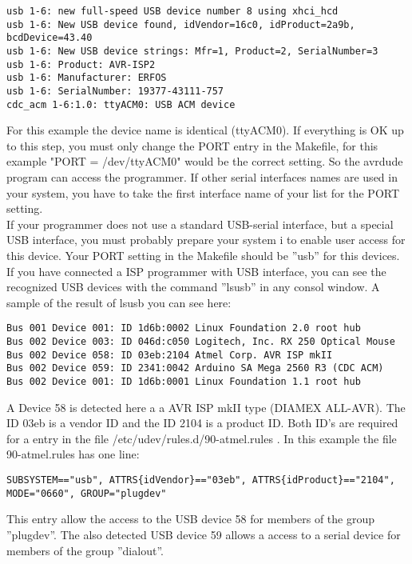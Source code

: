 \begin{verbatim}
usb 1-6: new full-speed USB device number 8 using xhci_hcd
usb 1-6: New USB device found, idVendor=16c0, idProduct=2a9b, bcdDevice=43.40
usb 1-6: New USB device strings: Mfr=1, Product=2, SerialNumber=3
usb 1-6: Product: AVR-ISP2
usb 1-6: Manufacturer: ERFOS
usb 1-6: SerialNumber: 19377-43111-757
cdc_acm 1-6:1.0: ttyACM0: USB ACM device
\end{verbatim}

For this example the device name is identical (ttyACM0).
If everything is OK up to this step, you must only change the PORT entry in the Makefile,
for this example "PORT = /dev/ttyACM0" would be the correct setting.
So the avrdude program can access the programmer.
If other serial interfaces names are used in your system, you have to take the first interface name
of your list for the PORT setting.\\

If your programmer does not use a standard USB-serial interface,
but a special USB interface,
you must probably prepare your system i to enable user access for this device.
Your PORT setting in the Makefile should be ''usb'' for this devices.
If you have connected a ISP programmer with USB interface,
you can see the recognized USB devices with the command ''lsusb'' in any consol window.
A sample of the result of lsusb you can see here:
\begin{verbatim}
Bus 001 Device 001: ID 1d6b:0002 Linux Foundation 2.0 root hub
Bus 002 Device 003: ID 046d:c050 Logitech, Inc. RX 250 Optical Mouse
Bus 002 Device 058: ID 03eb:2104 Atmel Corp. AVR ISP mkII
Bus 002 Device 059: ID 2341:0042 Arduino SA Mega 2560 R3 (CDC ACM)
Bus 002 Device 001: ID 1d6b:0001 Linux Foundation 1.1 root hub
\end{verbatim}
A Device 58 is detected here a a AVR ISP mkII type (DIAMEX ALL-AVR).
The ID 03eb is a vendor ID and the ID 2104 is a product ID.
Both ID's are required for a entry in the file /etc/udev/rules.d/90-atmel.rules .
In this example the file 90-atmel.rules has one line:
\begin{footnotesize}
\begin{verbatim}
SUBSYSTEM=="usb", ATTRS{idVendor}=="03eb", ATTRS{idProduct}=="2104", MODE="0660", GROUP="plugdev"
\end{verbatim}
\end{footnotesize}
This entry allow the access to the USB device 58 for members of the group ''plugdev''.
The also detected USB device 59 allows a access to a serial device for
members of the group ''dialout''.

